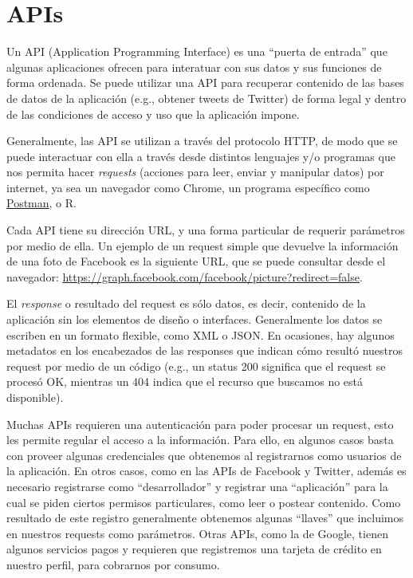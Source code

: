 \documentclass[
]{book}
\begin{document}
\hypertarget{apis}{%
\section{APIs}\label{apis}}

Un API (Application Programming Interface) es una ``puerta de entrada'' que algunas aplicaciones ofrecen para interatuar con sus datos y sus funciones de forma ordenada.
Se puede utilizar una API para recuperar contenido de las bases de datos de la aplicación (e.g., obtener tweets de Twitter) de forma legal y dentro de las condiciones de acceso y uso que la aplicación impone.

Generalmente, las API se utilizan a través del protocolo HTTP, de modo que se puede interactuar con ella a través desde distintos lenguajes y/o programas que nos permita hacer \emph{requests} (acciones para leer, enviar y manipular datos) por internet, ya sea un navegador como Chrome, un programa específico como \href{https://learning.postman.com/}{Postman}, o R.

Cada API tiene su dirección URL, y una forma particular de requerir parámetros por medio de ella. Un ejemplo de un request simple que devuelve la información de una foto de Facebook es la siguiente URL, que se puede consultar desde el navegador: \url{https://graph.facebook.com/facebook/picture?redirect=false}.

El \emph{response} o resultado del request es sólo datos, es decir, contenido de la aplicación sin los elementos de diseño o interfaces.
Generalmente los datos se escriben en un formato flexible, como XML o JSON.
En ocasiones, hay algunos metadatos en los encabezados de las responses que indican cómo resultó nuestros request por medio de un código (e.g., un status 200 significa que el request se procesó OK, mientras un 404 indica que el recurso que buscamos no está disponible).

Muchas APIs requieren una autenticación para poder procesar un request, esto les permite regular el acceso a la información. Para ello, en algunos casos basta con proveer algunas credenciales que obtenemos al registrarnos como usuarios de la aplicación. En otros casos, como en las APIs de Facebook y Twitter, además es necesario registrarse como ``desarrollador'' y registrar una ``aplicación'' para la cual se piden ciertos permisos particulares, como leer o postear contenido. Como resultado de este registro generalmente obtenemos algunas ``llaves'' que incluimos en nuestros requests como parámetros. Otras APIs, como la de Google, tienen algunos servicios pagos y requieren que registremos una tarjeta de crédito en nuestro perfil, para cobrarnos por consumo.
\end{document}
